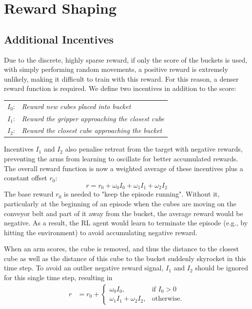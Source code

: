 \documentclass[conference,a4paper]{IEEEtran}
\begin{document}
\section{Reward Shaping}
\label{sec:shaping}

\subsection{Additional Incentives}

Due to the discrete, highly sparse reward, if only the score of the buckets is used, with simply performing random movements, a positive reward is extremely unlikely, making it difficult to train with this reward.
For this reason, a denser reward function is required.
We define two incentives in addition to the score:

\begin{center}
\begin{tabular}{r l}
$I_0$: & \itshape Reward new cubes placed into bucket\\
$I_1$: & \itshape Reward the gripper approaching the closest cube\\
$I_2$: & \itshape Reward the closest cube approaching the bucket
\end{tabular}
\end{center}
Incentives $I_1$ and $I_2$ also penalise retreat from the target with negative rewards, preventing the arms from learning to oscillate for better accumulated rewards. 
The overall reward function is now a weighted average of these incentives plus a constant offset \(r_0\):
\[r = r_0 + \omega_0I_0 + \omega_1I_1 + \omega_2I_2\]
The base reward \(r_0\) is needed to "keep the episode running". Without it, particularly at the beginning of an episode when the cubes are moving on the conveyor belt and part of it away from the bucket, the average reward would be negative. As a result, the RL agent would learn to terminate the episode (e.g., by hitting the environment) to avoid accumulating negative reward.

When an arm scores, the cube is removed, and thus the distance to the closest cube as well as the distance of this cube to the bucket suddenly skyrocket in this time step. 
To avoid an outlier negative reward signal, $I_1$ and $I_2$ should be ignored for this single time step, resulting in
\begin{align*}
r &= r_0 + \begin{cases}
    \omega_0 I_0, & \text{if } I_0 > 0 \\
    \omega_1 I_1 + \omega_2 I_2, & \text{otherwise.}
\end{cases}
\end{align*}
\end{document}
